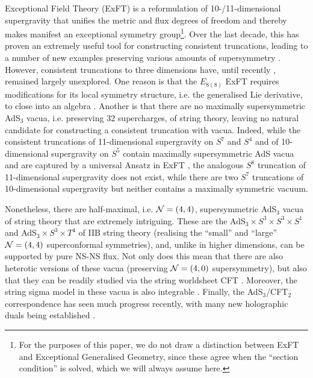 \documentclass[a4paper, 11pt]{article}
\numberwithin{equation}{section}
\newcommand{\EE}{\ensuremath{E_{8(8)}}\xspace}
\newcommand{\+}{\oplus}
\begin{document}
Exceptional Field Theory (ExFT) is a reformulation of 10-/11-dimensional supergravity that unifies the metric and flux degrees of freedom and thereby makes manifest an exceptional symmetry group\footnote{For the purposes of this paper, we do not draw a distinction between ExFT and Exceptional Generalised Geometry, since these agree when the ``section condition'' is solved, which we will always assume here.}. Over the last decade, this has proven an extremely useful tool for constructing consistent truncations, leading to a number of new examples preserving various amounts of supersymmetry \cite{Hohm:2014qga,Lee:2014mla,Malek:2015hma,Baguet:2015sma,Baguet:2015iou,Lee:2015xga,Malek:2016bpu,Ciceri:2016dmd,Cassani:2016ncu,Inverso:2016eet,Malek:2017cle,Malek:2017njj,Malek:2018zcz,Malek:2019ucd,Cassani:2019vcl,Malek:2020jsa,Cassani:2020cod}. However, consistent truncations to three dimensions have, until recently \cite{Galli:2022idq}, remained largely unexplored. One reason is that the $\EE$ ExFT requires modifications for its local symmetry structure, i.e. the generalised Lie derivative, to close into an algebra \cite{Hohm:2014fxa,Cederwall:2015ica}. Another is that there are no maximally supersymmetric AdS$_3$ vacua, i.e. preserving 32 supercharges, of string theory, leaving no natural candidate for constructing a consistent truncation with vacua. Indeed, while the consistent truncations of 11-dimensional supergravity on $S^7$ and $S^4$ and of 10-dimensional supergravity on $S^5$ contain maximally supersymmetric AdS vacua and are captured by a universal Ansatz in ExFT \cite{Hohm:2014qga,Lee:2014mla}, the analogous $S^8$ truncation of 11-dimensional supergravity does not exist, while there are two $S^7$ truncations of 10-dimensional supergravity but neither contains a maximally symmetric vacuum\cite{Fischbacher:2003yw,Galli:2022idq}.

Nonetheless, there are half-maximal, i.e. ${\cal N}=(4,4)$, supersymmetric AdS$_3$ vacua of string theory that are extremely intriguing. These are the AdS$_3 \times S^3 \times S^3 \times S^1$ and AdS$_3 \times S^3 \times T^4$ of IIB string theory (realising the ``small'' and ``large'' ${\cal N}=(4,4)$ superconformal symmetries), and, unlike in higher dimensions, can be supported by pure NS-NS flux. Not only does this mean that there are also heterotic versions of these vacua (preserving ${\cal N}=(4,0)$ supersymmetry), but also that they can be readily studied via the string worldsheet CFT \cite{Maldacena:2000hw,Eberhardt:2018ouy,Eberhardt:2019niq,Eberhardt:2019ywk}. Moreover, the string sigma model in these vacua is also integrable \cite{}. Finally, the AdS$_3$/CFT$_2$ correspondence has seen much progress recently, with many new holographic duals being established \cite{}.
\end{document}
